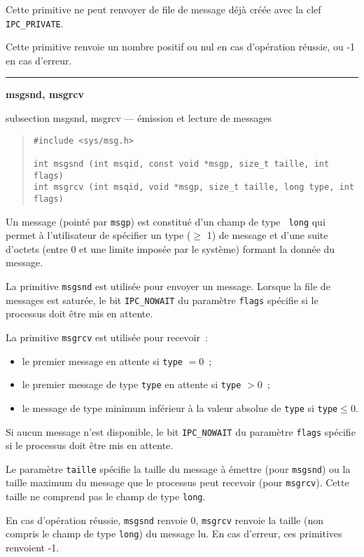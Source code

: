 \documentclass [twoside] {report}
\newcommand {\primitive} [1]
    {
	\phantomsection
	{\large \bf #1}
	\addcontentsline {toc} {subsection} {#1}
    }
\newcommand {\separation}
    {
	\vspace {5mm}
	\nopagebreak
	\hrule
    }
\begin{document}
Cette primitive ne peut renvoyer de file de message déjà créée avec la
clef {\tt IPC\_PRIVATE}.

Cette primitive renvoie un nombre positif ou nul en cas d'opération
réussie, ou -1 en cas d'erreur.


\separation
\primitive {msgsnd, msgrcv} --- émission et lecture de messages

\begin {quote}
\begin {verbatim}
#include <sys/msg.h>

int msgsnd (int msqid, const void *msgp, size_t taille, int flags)
int msgrcv (int msqid, void *msgp, size_t taille, long type, int flags)
\end{verbatim}
\end {quote}

Un message (pointé par {\tt msgp}) est constitué d'un champ de type {\tt
long} qui permet à l'utilisateur de spécifier un type ($\geq$ 1) de message
et d'une suite d'octets (entre 0 et une limite imposée
par le système) formant la donnée du message.

La primitive {\tt msgsnd} est utilisée pour envoyer un message.  Lorsque
la file de messages est saturée, le bit {\tt IPC\_NOWAIT} du paramètre
{\tt flags} spécifie si le processus doit être mis en attente.

La primitive {\tt msgrcv} est utilisée pour recevoir~:

\begin {itemize}
    \item le premier message en attente si {\tt type} $= 0$~;
    \item le premier message de type {\tt type} en attente si {\tt type}
	$> 0$~;
    \item le message de type minimum inférieur à la valeur absolue de
	{\tt type} si {\tt type}$\leq 0$.
\end {itemize}

Si aucun message n'est disponible, le bit {\tt IPC\_NOWAIT} du paramètre
{\tt flags} spécifie si le processus doit être mis en attente.

Le paramètre {\tt taille} spécifie la taille du message à émettre (pour
{\tt msgsnd}) ou la taille maximum du message que le processus peut
recevoir (pour {\tt msgrcv}).  Cette taille ne comprend pas le champ de
type {\tt long}.

En cas d'opération réussie, {\tt msgsnd} renvoie 0, {\tt msgrcv} renvoie
la taille (non compris le champ de type {\tt long}) du message lu.
En cas d'erreur, ces primitives renvoient -1.
\end{document}
